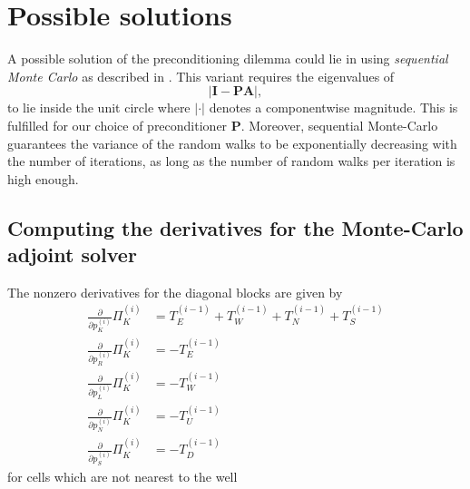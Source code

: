 \documentclass[conference]{IEEEtran}
\newcommand*{\pdiff}[2]{\ensuremath{\frac{\partial}{\partial{#2}}{#1}}}
\renewcommand*{\vec}[1]{\ensuremath{{\bm{#1}}}}
\newcommand*{\mat}[1]{\vec{#1}}
\begin{document}
\section{Possible solutions}
\label{possibleSolutions}
A possible solution of the preconditioning dilemma could lie in using \emph{sequential Monte Carlo}
as described in \cite{sequential}. This variant requires the eigenvalues of 
\begin{equation}
\lvert \mat{I} - \mat{PA} \rvert,
\end{equation}
to lie inside the unit circle where $\lvert \cdot \rvert$ denotes a componentwise magnitude.
This is fulfilled for our choice of preconditioner $\mat{P}$.
Moreover, sequential Monte-Carlo guarantees the variance of the random walks to be exponentially decreasing with the number of iterations, as long as the number of random walks per iteration is high enough.


\appendix

\subsection{Computing the derivatives for the Monte-Carlo adjoint solver}
\label{quantitiesNeeded}

The nonzero derivatives for the diagonal blocks are given by
\begin{align}
\pdiff{\Pi_K^{(i)}}{p_K^{(i)}} &= T_E^{(i-1)} + T_W^{(i-1)} + T_N^{(i-1)} + T_S^{(i-1)} \\
\pdiff{\Pi_K^{(i)}}{p_R^{(i)}} &= -T_E^{(i-1)} \\
\pdiff{\Pi_K^{(i)}}{p_L^{(i)}} &= -T_W^{(i-1)} \\
\pdiff{\Pi_K^{(i)}}{p_N^{(i)}} &= -T_U^{(i-1)} \\
\pdiff{\Pi_K^{(i)}}{p_S^{(i)}} &= -T_D^{(i-1)}
\end{align}
for cells which are not nearest to the well
\end{document}

